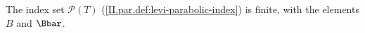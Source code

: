 The index set $\mathcal P(T)$ (\cref{II.par.def:levi-parabolic-index}) is finite, with the elements $B$ and $\Bbar$.
